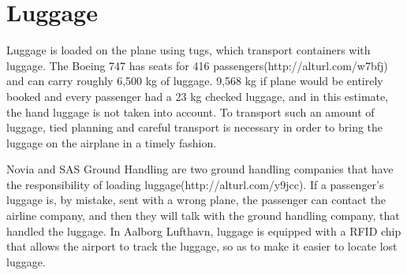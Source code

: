 \section{Luggage}
Luggage is loaded on the plane using tugs, which transport containers with luggage. The Boeing 747 has seats for 416 passengers(http://alturl.com/w7bfj) and can carry roughly 6,500 kg of luggage. %
9,568 kg if plane would be entirely booked and every passenger had a 23 kg checked luggage, and in this estimate, the hand luggage is not taken into account. To transport such an amount of luggage, tied planning and careful transport is necessary in order to bring the luggage on the airplane in a timely fashion. %


Novia and SAS Ground Handling are two ground handling companies that have the responsibility of loading luggage(http://alturl.com/y9jcc). If a passenger's luggage is, by mistake, sent with a wrong plane, the passenger can contact the airline company, and then they will talk with the ground handling company, that handled the luggage. In Aalborg Lufthavn, luggage is equipped with a RFID chip that allows the airport to track the luggage, so as to make it easier to locate lost luggage.